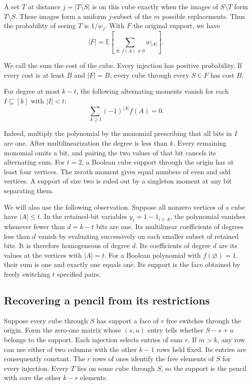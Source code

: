 \documentclass[11pt,letterpaper]{article}
\numberwithin{equation}{section}
\begin{document}
A set $T$ at distance $j=|T\setminus S|$ is on this cube exactly when the images of
$S\setminus T$ form $T\setminus S$. These images form a uniform $j$-subset of the $m$ possible
replacements. Thus the probability of seeing $T$ is $1/w_j$. With $F$ the original support, we
have
\begin{equation}
|F|=\mathbb E\left[\sum_{A:\,f(A)\ne0}w_{|A|}\right].
\label{eq:weight}
\end{equation}

We call the sum the cost of the cube. Every injection has positive probability. If every cost
is at least $B$ and $|F|=B$, every cube through every $S\in F$ has cost $B$.

For degree at most $k-t$, the following alternating moments vanish for each $I\subseteq[k]$ with $|I|<t$:
\begin{equation}
\sum_{A\supseteq I}(-1)^{|A|}f(A)=0.
\label{eq:moments}
\end{equation}

Indeed, multiply the polynomial by the monomial prescribing that all bits in $I$ are one.
After multilinearization the degree is less than $k$. Every remaining monomial omits a bit,
and pairing the two values of that bit cancels its alternating sum. For $t=2$, a Boolean cube
support through the origin has at least four vertices. The zeroth moment gives equal numbers
of even and odd vertices. A support of size two is ruled out by a singleton moment at any bit
separating them.

We will also use the following observation. Suppose all nonzero vertices of a cube have
$|A|\le t$. In the retained-bit variables $y_i=1-1_{i\in A}$, the polynomial vanishes whenever
fewer than $d=k-t$ bits are one. Its multilinear coefficients of degrees less than $d$ vanish
by evaluating successively on each smaller subset of retained bits. It is therefore
homogeneous of degree $d$. Its coefficients of degree $d$ are its values at the vertices with
$|A|=t$. For a Boolean polynomial with $f(\varnothing)=1$, their sum is one and exactly one
equals one. Its support is the face obtained by freely switching $t$ specified pairs.

\subsection{Recovering a pencil from its restrictions}\label{sec:rigidity}

Suppose every cube through $S$ has support a face of $r$ free switches through the origin.
Form the zero-one matrix whose $(s,u)$ entry tells whether $S-s+u$ belongs to the support.
Each injection selects entries of sum $r$. If $m>k$, any row can use either of two columns
with the other $k-1$ rows held fixed. Its entries are consequently constant. The $r$ rows of
ones identify the free elements of $S$ for every injection. Every $T$ lies on some cube
through $S$, so the support is the pencil with core the other $k-r$ elements.
\end{document}
